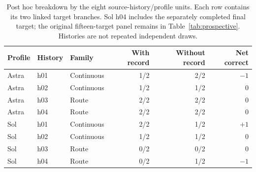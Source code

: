 \begin{table}[htbp]
\centering\small
\begin{tabular}{lllrrr}\toprule
Profile & History & Family & With record & Without record & Net correct\\\midrule
Astra & h01 & Continuous & 1/2 & 2/2 & $-1$\\
Astra & h02 & Continuous & 1/2 & 1/2 & $0$\\
Astra & h03 & Route & 2/2 & 2/2 & $0$\\
Astra & h04 & Route & 2/2 & 2/2 & $0$\\
Sol & h01 & Continuous & 2/2 & 1/2 & $+1$\\
Sol & h02 & Continuous & 1/2 & 1/2 & $0$\\
Sol & h03 & Route & 0/2 & 0/2 & $0$\\
Sol & h04 & Route & 0/2 & 1/2 & $-1$\\
\bottomrule\end{tabular}
\caption{Post hoc breakdown by the eight source-history/profile units.
Each row contains its two linked target branches. Sol h04 includes the
separately completed final target; the original fifteen-target panel remains
in Table~\ref{tab:prospective}. Histories are not repeated independent draws.}
\label{tab:prospective-histories}
\end{table}
